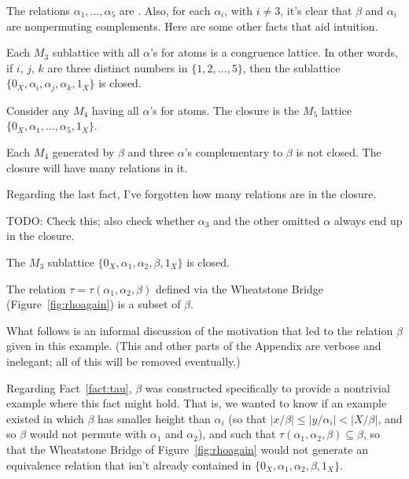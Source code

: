The relations $\alpha_1, \dots, \alpha_5$ are \pppc.  Also, for 
each $\alpha_i$, with $i\neq 3$, it's clear that $\beta$ and $\alpha_i$ are
nonpermuting complements.
Here are some other facts that aid intuition.
\begin{fact}
  Each $M_3$ sublattice with all $\alpha$'s for atoms is a congruence lattice.  In
  other words, if $i$, $j$, $k$ are three distinct numbers in $\{1,2,\dots, 5\}$, then the sublattice $\{0_X, \alpha_i, \alpha_j,
  \alpha_k, 1_X\}$ is closed. 
\end{fact}
\begin{fact}
Consider any $M_4$ having all $\alpha$'s for atoms.  The closure is the $M_5$
lattice $\{0_X, \alpha_1, \dots, \alpha_5, 1_X\}$.
\end{fact}
\begin{fact}
  Each $M_4$ generated by $\beta$ and three $\alpha$'s complementary to
  $\beta$ is not closed.  The closure will have many relations in it.
\end{fact}
Regarding the last fact, I've forgotten how many relations are in the closure.

TODO: Check this; also check whether $\alpha_3$ and the other omitted $\alpha$
  always end up in the closure.
\begin{fact}
  The $M_3$ sublattice $\{0_X, \alpha_1, \alpha_2, \beta, 1_X\}$ is closed.
\end{fact}
  \begin{fact}
\label{fact:tau}
  The relation $\tau = \tau(\alpha_1, \alpha_2, \beta)$ defined via the
  Wheatstone Bridge (Figure~\ref{fig:rhoagain}) is a subset of $\beta$.
  \end{fact}

What follows is an informal discussion of the motivation that led to the
relation $\beta$ given in this example.  (This and other parts of
the Appendix are verbose and inelegant; all of this will be removed
eventually.) 

Regarding Fact~\ref{fact:tau}, $\beta$ was constructed specifically to provide a
nontrivial example where this fact might hold.  That is, we wanted to know if
an example existed in which $\beta$ has smaller height than $\alpha_i$ (so that 
$|x/\beta| \leq |y/\alpha_i| < |X/\beta|$, and so $\beta$ would not permute
with $\alpha_1$ and $\alpha_2$), and such that 
$\tau(\alpha_1, \alpha_2, \beta)\subseteq \beta$, so that the Wheatstone
Bridge of Figure~\ref{fig:rhoagain} would not generate an equivalence
relation that isn't already contained in 
$\{0_X, \alpha_1, \alpha_2, \beta, 1_X\}$.

